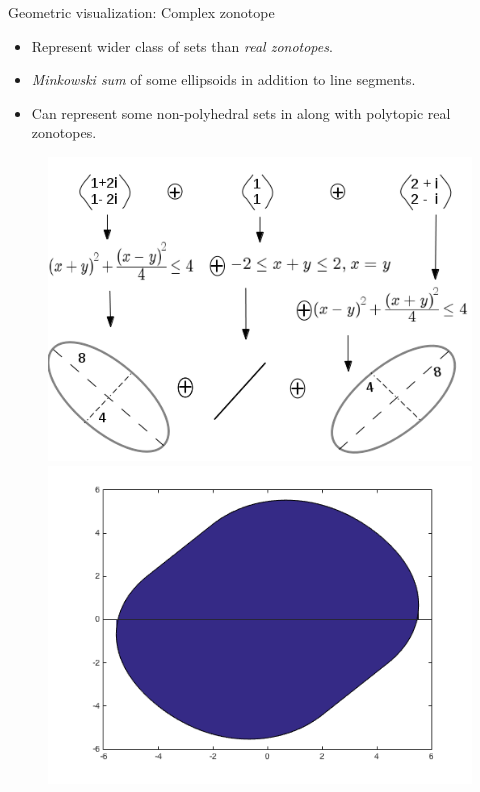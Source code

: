\begin{frame}{Geometric visualization: Complex zonotope}
\begin{itemize}
\item Represent {\color{blue} wider class of sets} than {\it real zonotopes}.
\item {\it Minkowski sum} of {\color{blue} some ellipsoids} in
addition to {\color{blue}line segments}.
\item Can represent some {\color{blue} non-polyhedral sets} in
along with {\color{blue} polytopic real zonotopes}.
\end{itemize}
%
\begin{figure}
\includegraphics[scale=0.45]{figures/complex-zonotope.png}
\includegraphics[scale=0.3]{figures/CZhull.png}
\end{figure}
%
\end{frame}

